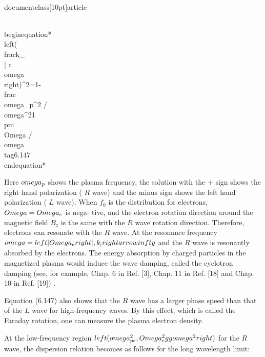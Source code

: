 \\documentclass[10pt]{article}
\begin{document}
{{{{\\begin{equation*}
\\left(\\frac{k_{\\|} c}{\\omega}\\right)^{2}=1-\\frac{\\omega_{p}^{2} / \\omega^{2}}{1 \\pm \\Omega / \\omega} \\tag{6.147}
\\end{equation*}


Here $\\omega_{p}$ shows the plasma frequency, the solution with the + sign shows the right hand polarization ( $R$ wave) and the minus sign shows the left hand polarization ( $L$ wave). When $f_{0}$ is the distribution for electrons, $\\Omega=\\Omega_{e}$ is nega-
tive, and the electron rotation direction around the magnetic field $B_{z}$ is the same with the $R$ wave rotation direction. Therefore, electrons can resonate with the $R$ wave. At the resonance frequency $\\omega=\\left|\\Omega_{e}\\right|, k_{\\|} \\rightarrow \\infty$ and the $R$ wave is resonantly absorbed by the electrons. The energy absorption by charged particles in the magnetized plasma would induce the wave damping, called the cyclotron damping (see, for example, Chap. 6 in Ref. [3], Chap. 11 in Ref. [18] and Chap. 10 in Ref. [19]) .

Equation (6.147) also shows that the $R$ wave has a larger phase speed than that of the $L$ wave for high-frequency waves. By this effect, which is called the Faraday rotation, one can measure the plasma electron density.

At the low-frequency region $\\left(\\omega_{p e}^{2}, \\Omega_{e}^{2} \\gg \\omega^{2}\\right)$ for the $R$ wave, the dispersion relation becomes as follows for the long wavelength limit:


}}}}
\end{document}
